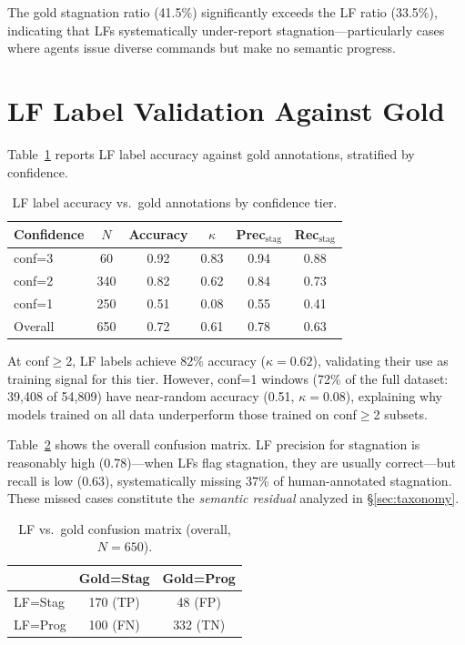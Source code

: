 \documentclass[11pt]{article}
\begin{document}
The gold stagnation ratio (41.5\%) significantly exceeds the LF ratio (33.5\%), indicating that LFs systematically under-report stagnation---particularly cases where agents issue diverse commands but make no semantic progress.

\section{LF Label Validation Against Gold}
\label{sec:lf-validation}

Table~\ref{tab:lf-gold} reports LF label accuracy against gold annotations, stratified by confidence.

\begin{table}[t]
\centering
\small
\caption{LF label accuracy vs.\ gold annotations by confidence tier.}
\label{tab:lf-gold}
\begin{tabular}{lccccc}
\toprule
Confidence & $N$ & Accuracy & $\kappa$ & Prec$_\text{stag}$ & Rec$_\text{stag}$ \\
\midrule
conf=3 & 60 & 0.92 & 0.83 & 0.94 & 0.88 \\
conf=2 & 340 & 0.82 & 0.62 & 0.84 & 0.73 \\
conf=1 & 250 & 0.51 & 0.08 & 0.55 & 0.41 \\
\midrule
Overall & 650 & 0.72 & 0.61 & 0.78 & 0.63 \\
\bottomrule
\end{tabular}
\end{table}

At conf$\geq$2, LF labels achieve 82\% accuracy ($\kappa\!=\!0.62$), validating their use as training signal for this tier. However, conf=1 windows (72\% of the full dataset: 39,408 of 54,809) have near-random accuracy (0.51, $\kappa\!=\!0.08$), explaining why models trained on all data underperform those trained on conf$\geq$2 subsets.

Table~\ref{tab:lf-confusion} shows the overall confusion matrix. LF precision for stagnation is reasonably high (0.78)---when LFs flag stagnation, they are usually correct---but recall is low (0.63), systematically missing 37\% of human-annotated stagnation. These missed cases constitute the \emph{semantic residual} analyzed in \S\ref{sec:taxonomy}.

\begin{table}[t]
\centering
\small
\caption{LF vs.\ gold confusion matrix (overall, $N\!=\!650$).}
\label{tab:lf-confusion}
\begin{tabular}{lcc}
\toprule
 & Gold=Stag & Gold=Prog \\
\midrule
LF=Stag & 170 (TP) & 48 (FP) \\
LF=Prog & 100 (FN) & 332 (TN) \\
\bottomrule
\end{tabular}
\end{table}
\end{document}
